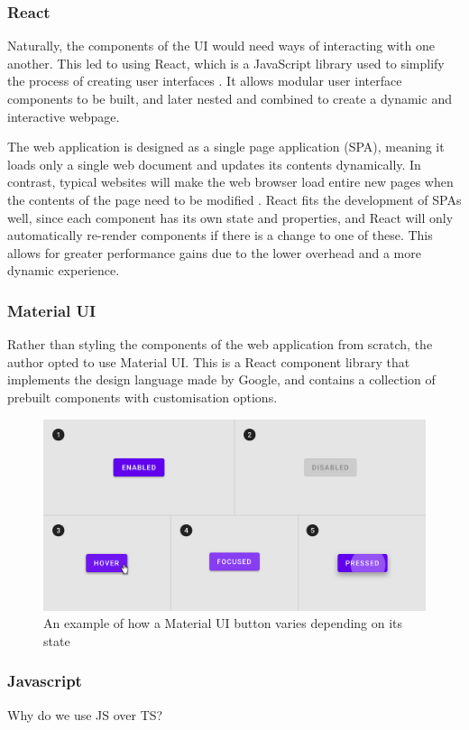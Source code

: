 \subsubsection{React}
Naturally, the components of the UI would need ways of interacting with one another. This led to using React, which is a JavaScript library used to simplify the process of creating user interfaces \cite{whatisReact}. It allows modular user interface components to be built, and later nested and combined to create a dynamic and interactive webpage. 

The web application is designed as a single page application (SPA), meaning it loads only a single web document and updates its contents dynamically. In contrast, typical websites will make the web browser load entire new pages when the contents of the page need to be modified \cite{singlepageapp}. React fits the development of SPAs well, since each component has its own state and properties, and React will only automatically re-render components if there is a change to one of these.
This allows for greater performance gains due to the lower overhead and a more dynamic experience.

\subsubsection{Material UI}
 Rather than styling the components of the web application from scratch, the author opted to use Material UI. This is a React component library that implements the design language made by Google, and contains a collection of prebuilt components with customisation options.

\begin{figure}[h]
    \centering
    \includegraphics[scale=0.35]{./images/materialUIbutton.png}
    \caption{An example of how a Material UI button varies depending on its state \cite{materialUIbuttons}}
\end{figure}

\subsubsection{Javascript}
Why do we use JS over TS?